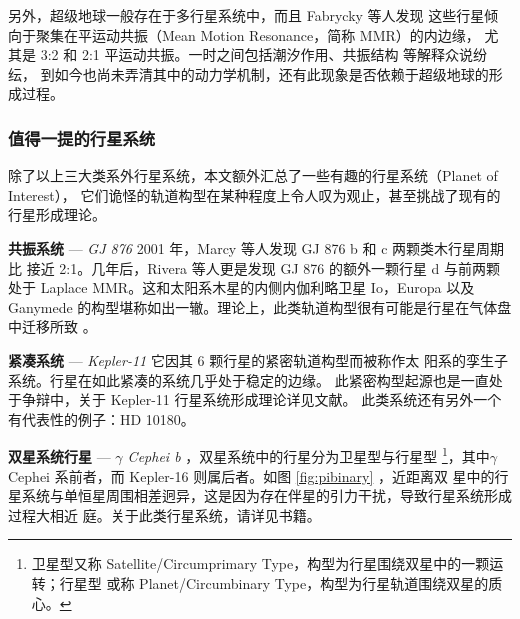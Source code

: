 另外，超级地球一般存在于多行星系统中\cite{Borucki2011}，而且 Fabrycky 等人发现
这些行星倾向于聚集在平运动共振（Mean Motion Resonance，简称 MMR）的内边缘，
尤其是 3:2 和 2:1 平运动共振\cite{Fabrycky2014}。一时之间包括潮汐作用、共振结构
等解释众说纷纭\cite{LithwickWu2012,Lee2013,Batygin2013,Baruteau2013,Delisle2014,Chatterjee2015}，
到如今也尚未弄清其中的动力学机制，还有此现象是否依赖于超级地球的形成过程。

\subsubsection{值得一提的行星系统} 

除了以上三大类系外行星系统，本文额外汇总了一些有趣的行星系统（Planet of Interest），
它们诡怪的轨道构型在某种程度上令人叹为观止，甚至挑战了现有的行星形成理论。

\textbf{共振系统} --- \textit{GJ 876}  {} 2001 年，Marcy 等人发现 GJ 876 b 和 c 两颗类木行星周期比
接近 2:1\cite{Marcy2001}。几年后，Rivera 等人更是发现 GJ 876 的额外一颗行星 d 与前两颗
处于 Laplace MMR\cite{Rivera2010}。这和太阳系木星的内侧内伽利略卫星 Io，Europa 以及 
Ganymede 的构型堪称如出一辙。理论上，此类轨道构型很有可能是行星在气体盘中迁移所致
\cite{KleyNelson2012,ZhangZhou2010}。

\textbf{紧凑系统} --- \textit{Kepler-11}  {} 它因其 6 颗行星的紧密轨道构型\cite{Lissauer2011}而被称作太
阳系的孪生子系统\cite{Zhou2012}。行星在如此紧凑的系统几乎处于稳定的边缘\cite{Mahajan2014}。
此紧密构型起源也是一直处于争辩中，关于 Kepler-11 行星系统形成理论详见文献。
此类系统还有另外一个有代表性的例子：HD 10180\cite{Lovis2011}。

\textbf{双星系统行星} --- \textit{$\gamma$ Cephei b}  {} ，双星系统中的行星分为卫星型与行星型
\footnote{卫星型又称 Satellite/Circumprimary Type，构型为行星围绕双星中的一颗运转；行星型
或称 Planet/Circumbinary Type，构型为行星轨道围绕双星的质心。}，其中$\gamma$ Cephei
\cite{Hatzes2003} 系前者，而 Kepler-16\cite{Doyle2011} 则属后者。如图 \ref{fig:pibinary} ，近距离双
星中的行星系统与单恒星周围相差迥异，这是因为存在伴星的引力干扰，导致行星系统形成过程大相近
庭。关于此类行星系统，请详见书籍。

